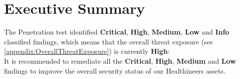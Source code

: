 %
%
%
\clearpage

\chapter{Executive Summary}
\label{chapter:ExecutiveSummary}





The Penetration test identified \textbf{\FindingsCountCritical} \textbf{Critical}, \textbf{\FindingsCountHigh} \textbf{High}, \textbf{\FindingsCountMedium} \textbf{Medium}, \textbf{\FindingsCountLow} \textbf{Low} and \textbf{\FindingsCountInfo} \textbf{Info} classified findings, which means that the overall threat exposure (see \cref{appendix:OverallThreatExposure}) is currently \textbf{High}:\\



It is recommended to remediate all the \textbf{Critical}, \textbf{High}, \textbf{Medium} and \textbf{Low} findings to improve the overall security status of our Healthineers assets.